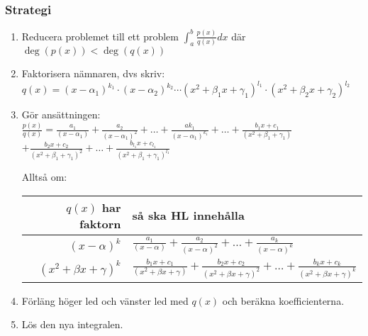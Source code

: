 \documentclass{article}
\begin{document}
\subsubsection{Strategi}
\begin{enumerate}
   \item Reducera problemet till ett problem ${\displaystyle\int_{a}^{b}\frac{p(x)}{q(x)}dx}$ där $\deg(p(x))<\deg(q(x))$
   \item Faktorisera nämnaren, dvs skriv:\\
   $q(x)=(x-\alpha_{1})^{k_{1}}\cdot(x-\alpha_{2})^{k_{2}}\cdots(x^2+\beta_{1}x+\gamma_{1})^{l_{1}}\cdot(x^2+\beta_{2}x+\gamma_{2})^{l_{2}}$
   \item Gör ansättningen:\\
   ${\displaystyle\frac{p(x)}{q(x)}=\frac{a_{1}}{(x-\alpha_{1})}+\frac{a_{2}}{(x-\alpha_{1})^{2}}+\ldots+\frac{ak_{1}}{(x-\alpha_{1})^{k_{1}}}+\ldots+\frac{b_{1}x+c_{1}}{(x^{2}+\beta_{1}+\gamma_{1})}}$ \\
   ${\displaystyle+\frac{b_{2}x+c_{2}}{(x^2+\beta_{1}+\gamma_{1})^{2}}+\ldots+\frac{b_{l_{1}}x+c_{l_{1}}}{(x^2+\beta_{1}+\gamma_{1})^{l_{1}}}}$

   Alltså om:
   \begin{table}[!h]
   \centering
   \begin{tabular}{|r|l|}
   \hline
$q(x)$ har faktorn       & så ska HL innehålla                        \\ \hline
   ${\displaystyle (x-\alpha)^k}$           & ${\displaystyle \frac{a_{1}}{(x-\alpha)}+\frac{a_{2}}{(x-\alpha)^2}+\ldots+\frac{a_{k}}{(x-\alpha)^k}}$                                                          \\ \hline
   ${\displaystyle(x^2+\beta x+\gamma)^k}$ & ${\displaystyle \frac{b_{1}x+c_{1}}{(x^2+\beta x+\gamma)}+\frac{b_{2}x+c_{2}}{(x^2+\beta x+\gamma)^2}+\ldots+\frac{b_{k}x+c_{k}}{(x^2+\beta x+\gamma)^k}}$  \\ \hline
   \end{tabular}
   \end{table}
   \item Förläng höger led och vänster led med $q(x)$ och beräkna koefficienterna.
   \item Lös den nya integralen.
\end{enumerate}
\end{document}
